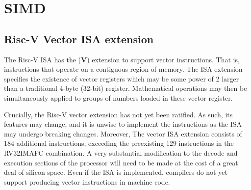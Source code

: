\documentclass[a4paper,8pt]{report}
\begin{document}




% 






\section{SIMD}
\subsection{Risc-V Vector ISA extension}
The Risc-V ISA has the (\textbf{V}) extension to support vector instructions.
That is, instructions that operate on a contiguous region of memory. The ISA
extension specifies the existence of vector registers which may be some power of
2 larger than a traditional 4-byte (32-bit) register. Mathematical operations
may then be simultaneously applied to groups of numbers loaded in these vector
register.

Crucially, the Risc-V vector extension has not yet been ratified. As such, its
features may change, and it is unwise to implement the instructions as the ISA
may undergo breaking changes. Moreover, The vector ISA extension consists of 184
additional instructions, exceeding the preexisting 129 instructions in the
RV32IMAFC combination. A very substantial modification to the decode and
execution sections of the processor will need to be made at the cost of a great
deal of silicon space. Even if the ISA is implemented, compilers do not yet support producing vector instructions in machine code.
\end{document}
